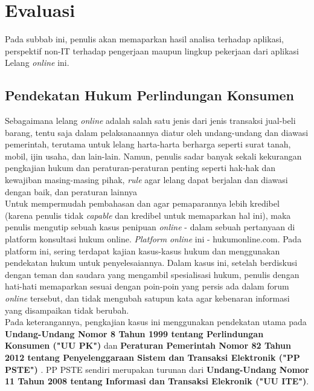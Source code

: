 \section{Evaluasi}
	Pada subbab ini, penulis akan memaparkan hasil analisa terhadap aplikasi, perspektif non-IT terhadap pengerjaan maupun lingkup pekerjaan dari aplikasi Lelang \textit{online} ini.
		
	\subsection{Pendekatan Hukum Perlindungan Konsumen}
	
	Sebagaimana lelang \textit{online} adalah salah satu jenis dari jenis transaksi jual-beli barang, tentu saja dalam pelaksanaannya diatur oleh undang-undang dan diawasi pemerintah, terutama untuk lelang harta-harta berharga seperti surat tanah, mobil, ijin usaha, dan lain-lain. Namun, penulis sadar banyak sekali kekurangan pengkajian hukum dan peraturan-peraturan penting seperti hak-hak dan kewajiban masing-masing pihak, \textit{rule} agar lelang dapat berjalan dan diawasi dengan baik, dan peraturan lainnya\\
	Untuk mempermudah pembahasan dan agar pemaparannya lebih kredibel (karena penulis tidak \textit{capable} dan kredibel untuk memaparkan hal ini), maka penulis mengutip sebuah kasus penipuan \textit{online} - dalam sebuah pertanyaan di platform konsultasi hukum online. \textit{Platform} \textit{online} ini - hukumonline.com. Pada platform ini, sering terdapat kajian kasus-kasus hukum dan menggunakan pendekatan hukum untuk penyelesaiannya. Dalam kasus ini, setelah berdiskusi dengan teman dan saudara yang mengambil spesialisasi hukum, penulis dengan hati-hati memaparkan sesuai dengan poin-poin yang persis ada dalam forum \textit{online} tersebut, dan tidak mengubah satupun kata agar kebenaran informasi yang disampaikan tidak berubah.\\
	\indent Pada keterangannya, pengkajian kasus ini menggunakan pendekatan utama pada \textbf{Undang-Undang Nomor 8 Tahun 1999 tentang Perlindungan Konsumen ("UU PK") } dan \textbf{Peraturan Pemerintah Nomor 82 Tahun 2012 tentang Penyelenggaraan Sistem dan Transaksi Elektronik ("PP PSTE") }. PP PSTE sendiri merupakan turunan dari \textbf{Undang-Undang Nomor 11 Tahun 2008 tentang Informasi dan Transaksi Elekronik ("UU ITE")}.
	
			
	
